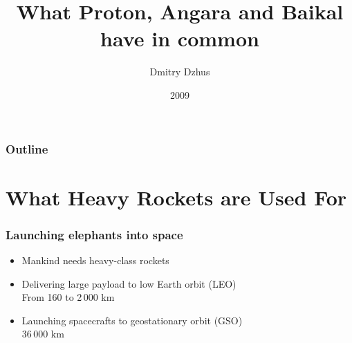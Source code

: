 \documentclass[onlymath]{beamer}
\title{What Proton, Angara and Baikal have in common}
\author{Dmitry Dzhus}
\institute[BMSTU]{Moscow State Technical University n.a. N.E.Bauman}
\date{2009}
\begin{document}
\begin{frame}
  \titlepage
\end{frame}

\begin{frame}
  \frametitle{Outline}
  \tableofcontents
\end{frame}

\section{What Heavy Rockets are Used For}
\begin{frame}
  \frametitle{Launching elephants into space}

  \begin{itemize}
  \item Mankind needs heavy-class rockets
  \item Delivering large payload to low Earth orbit (LEO) \\From 160
    to 2\,000 km
  \item Launching spacecrafts to geostationary orbit (GSO)
    \\36\,000 km
  \end{itemize}
\end{frame}
\end{document}
